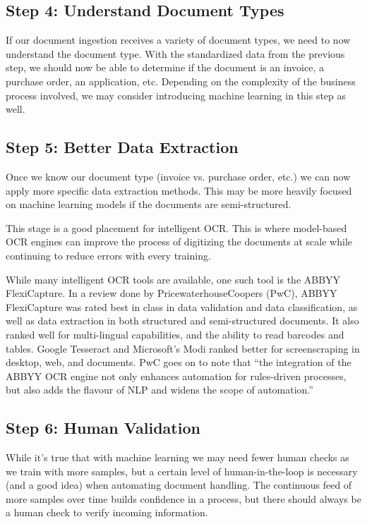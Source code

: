 \documentclass[conference]{IEEEtran}
\begin{document}
\subsection{Step 4: Understand Document Types}
If our document ingestion receives a variety of document types, we need to now understand the document type. With the standardized data from the previous step, we should now be able to determine if the document is an invoice, a purchase order, an application, etc. Depending on the complexity of the business process involved, we may consider introducing machine learning in this step as well.

\subsection{Step 5: Better Data Extraction}
Once we know our document type (invoice vs. purchase order, etc.) we can now apply more specific data extraction methods. This may be more heavily focused on machine learning models if the documents are semi-structured.

This stage is a good placement for intelligent OCR. This is where model-based OCR engines can improve the process of digitizing the documents at scale while continuing to reduce errors with every training.

While many intelligent OCR tools are available, one such tool is the ABBYY FlexiCapture. In a review done by PricewaterhouseCoopers (PwC), ABBYY FlexiCapture was rated best in class in data validation and data classification, as well as data extraction in both structured and semi-structured documents. It also ranked well for multi-lingual capabilities, and the ability to read barcodes and tables. Google Tesseract and Microsoft's Modi ranked better for screenscraping in desktop, web, and documents. PwC goes on to note that ``the integration of the ABBYY OCR engine not only enhances automation for rules-driven processes, but also adds the flavour of NLP and widens the scope of automation.'' \cite{pwc2018robotic}

\subsection{Step 6: Human Validation}
While it's true that with machine learning we may need fewer human checks as we train with more samples, but a certain level of human-in-the-loop is necessary (and a good idea) when automating document handling. The continuous feed of more samples over time builds confidence in a process, but there should always be a human check to verify incoming information.
\end{document}
